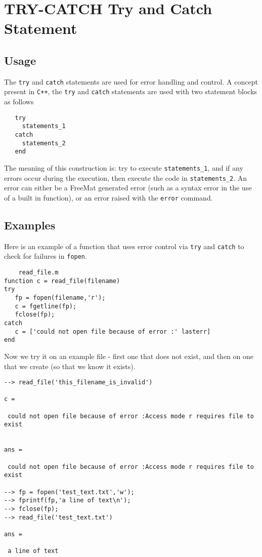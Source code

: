 \section{TRY-CATCH Try and Catch Statement}

\subsection{Usage}

The \verb|try| and \verb|catch| statements are used for error handling
and control.  A concept present in \verb|C++|, the \verb|try| and \verb|catch|
statements are used with two statement blocks as follows
\begin{verbatim}
   try
     statements_1
   catch
     statements_2
   end
\end{verbatim}
The meaning of this construction is: try to execute \verb|statements_1|,
and if any errors occur during the execution, then execute the
code in \verb|statements_2|.  An error can either be a FreeMat generated
error (such as a syntax error in the use of a built in function), or
an error raised with the \verb|error| command.
\subsection{Examples}

Here is an example of a function that uses error control via \verb|try|
and \verb|catch| to check for failures in \verb|fopen|.
\begin{verbatim}
    read_file.m
function c = read_file(filename)
try
   fp = fopen(filename,'r');
   c = fgetline(fp);
   fclose(fp);
catch
   c = ['could not open file because of error :' lasterr]
end
\end{verbatim}
Now we try it on an example file - first one that does not exist,
and then on one that we create (so that we know it exists).
\begin{verbatim}
--> read_file('this_filename_is_invalid')

c = 

 could not open file because of error :Access mode r requires file to exist 


ans = 

 could not open file because of error :Access mode r requires file to exist 

--> fp = fopen('test_text.txt','w');
--> fprintf(fp,'a line of text\n');
--> fclose(fp);
--> read_file('test_text.txt')

ans = 

 a line of text
\end{verbatim}
